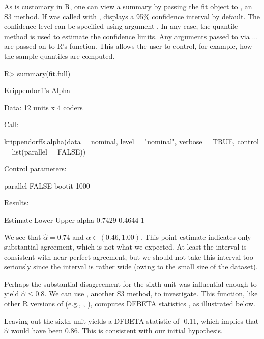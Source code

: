 As is customary in R, one can view a summary by passing the fit object to , an S3 method. If  was called with ,  displays a 95\% confidence interval by default. The confidence level can be specified using argument . In any case, the quantile method \citep{davison1997bootstrap} is used to estimate the confidence limits. Any arguments passed to  via $\dots$ are passed on to R's  function. This allows the user to control, for example, how the sample quantiles are computed.

\begin{example}
R> summary(fit.full)

Krippendorff's Alpha

Data: 12 units x 4 coders

Call:

krippendorffs.alpha(data = nominal, level = "nominal", verbose = TRUE, 
    control = list(parallel = FALSE))

Control parameters:
              
parallel FALSE
bootit   1000 
              
Results:

      Estimate  Lower Upper
alpha   0.7429 0.4644     1
\end{example}

We see that $\hat{\alpha}=0.74$ and $\alpha\in(0.46, 1.00)$. This point estimate indicates only substantial agreement, which is not what we expected. At least the interval is consistent with near-perfect agreement, but we should not take this interval too seriously since the interval is rather wide (owing to the small size of the dataset).

Perhaps the substantial disagreement for the sixth unit was influential enough to yield $\hat{\alpha}\leq 0.8$. We can use , another S3 method, to investigate. This function, like other R versions of  (e.g., , ), computes DFBETA statistics \citep{Young2017Handbook-of-Reg}, as illustrated below.


Leaving out the sixth unit yields a DFBETA statistic of -0.11, which implies that $\hat{\alpha}$ would have been 0.86. This is consistent with our initial hypothesis.

